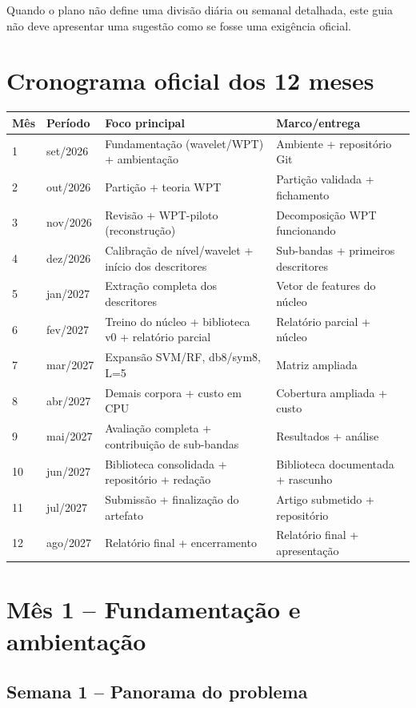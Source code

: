 \documentclass[12pt,a4paper]{article}
\begin{document}
Quando o plano não define uma divisão diária ou semanal detalhada, este guia não deve apresentar uma sugestão como se fosse uma exigência oficial.

\section{Cronograma oficial dos 12 meses}

\begin{longtable}{p{1.2cm}p{2.2cm}p{6cm}p{4cm}}
\toprule
Mês & Período & Foco principal & Marco/entrega\\
\midrule
1 & set/2026 & Fundamentação (wavelet/WPT) + ambientação & Ambiente + repositório Git\\
2 & out/2026 & Partição + teoria WPT & Partição validada + fichamento\\
3 & nov/2026 & Revisão + WPT-piloto (reconstrução) & Decomposição WPT funcionando\\
4 & dez/2026 & Calibração de nível/wavelet + início dos descritores & Sub-bandas + primeiros descritores\\
5 & jan/2027 & Extração completa dos descritores & Vetor de features do núcleo\\
6 & fev/2027 & Treino do núcleo + biblioteca v0 + relatório parcial & Relatório parcial + núcleo\\
7 & mar/2027 & Expansão SVM/RF, db8/sym8, L=5 & Matriz ampliada\\
8 & abr/2027 & Demais corpora + custo em CPU & Cobertura ampliada + custo\\
9 & mai/2027 & Avaliação completa + contribuição de sub-bandas & Resultados + análise\\
10 & jun/2027 & Biblioteca consolidada + repositório + redação & Biblioteca documentada + rascunho\\
11 & jul/2027 & Submissão + finalização do artefato & Artigo submetido + repositório\\
12 & ago/2027 & Relatório final + encerramento & Relatório final + apresentação\\
\bottomrule
\end{longtable}

\section{Mês 1 -- Fundamentação e ambientação}

\subsection{Semana 1 -- Panorama do problema}
\end{document}
